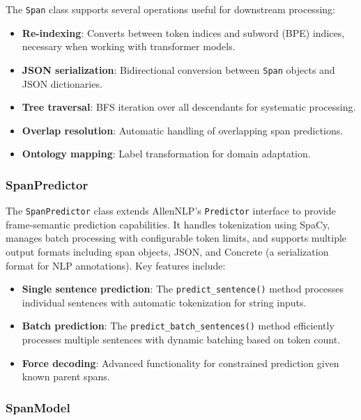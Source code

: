The \texttt{Span} class supports several operations useful for downstream processing:
\begin{itemize}
    \item \textbf{Re-indexing}: Converts between token indices and subword (BPE) indices, necessary when working with transformer models.
    \item \textbf{JSON serialization}: Bidirectional conversion between \texttt{Span} objects and JSON dictionaries.
    \item \textbf{Tree traversal}: BFS iteration over all descendants for systematic processing.
    \item \textbf{Overlap resolution}: Automatic handling of overlapping span predictions.
    \item \textbf{Ontology mapping}: Label transformation for domain adaptation.
\end{itemize}

\subsubsection{SpanPredictor}

The \texttt{SpanPredictor} class extends AllenNLP's \texttt{Predictor} interface to provide frame-semantic prediction capabilities. It handles tokenization using SpaCy, manages batch processing with configurable token limits, and supports multiple output formats including span objects, JSON, and Concrete (a serialization format for NLP annotations). Key features include:

\begin{itemize}
    \item \textbf{Single sentence prediction}: The \texttt{predict\_sentence()} method processes individual sentences with automatic tokenization for string inputs.
    \item \textbf{Batch prediction}: The \texttt{predict\_batch\_sentences()} method efficiently processes multiple sentences with dynamic batching based on token count.
    \item \textbf{Force decoding}: Advanced functionality for constrained prediction given known parent spans.
\end{itemize}

\subsubsection{SpanModel}

